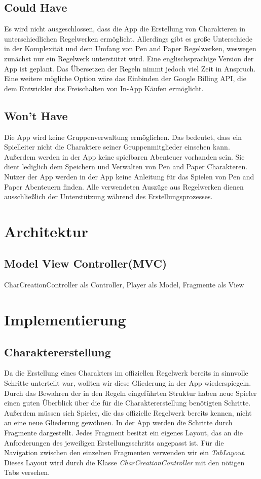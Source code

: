 \subsection{Could Have}
Es wird nicht ausgeschlossen, dass die App die Erstellung von Charakteren in unterschiedlichen Regelwerken ermöglicht. Allerdings gibt es große Unterschiede in der Komplexität und dem Umfang von Pen and Paper Regelwerken, weswegen zunächst nur ein Regelwerk unterstützt wird. Eine englischsprachige Version der App ist geplant. Das Übersetzen der Regeln nimmt jedoch viel Zeit in Anspruch. Eine weitere mögliche Option wäre das Einbinden der Google Billing API, die dem Entwickler das Freischalten von In-App Käufen ermöglicht.

\subsection{Won't Have}
Die App wird keine Gruppenverwaltung ermöglichen. Das bedeutet, dass ein Spielleiter nicht die Charaktere seiner Gruppenmitglieder einsehen kann. Außerdem werden in der App keine spielbaren Abenteuer vorhanden sein. Sie dient lediglich dem Speichern und Verwalten von Pen and Paper Charakteren. Nutzer der App werden in der App keine Anleitung für das Spielen von Pen and Paper Abenteuern finden. Alle verwendeten Auszüge aus Regelwerken dienen ausschließlich der Unterstützung während des Erstellungsprozesses. 

\newpage
\section{Architektur}
\subsection{Model View Controller(MVC)}
CharCreationController als Controller, Player als Model, Fragmente als View

\newpage
\section{Implementierung}

\subsection{Charaktererstellung}
Da die Erstellung eines Charakters im offiziellen Regelwerk bereits in sinnvolle Schritte unterteilt war, wollten wir diese Gliederung in der App wiederspiegeln. Durch das Bewahren der in den Regeln eingeführten Struktur haben neue Spieler einen guten Überblick über die für die Charaktererstellung benötigten Schritte. Außerdem müssen sich Spieler, die das offizielle Regelwerk bereits kennen, nicht an eine neue Gliederung gewöhnen. In der App werden die Schritte durch Fragmente dargestellt. Jedes Fragment besitzt ein eigenes Layout, das an die Anforderungen des jeweiligen Erstellungsschritts angepasst ist. Für die Navigation zwischen den einzelnen Fragmenten verwenden wir ein \textit{TabLayout}. Dieses Layout wird durch die Klasse \textit{CharCreationController} mit den nötigen Tabs versehen.\\

